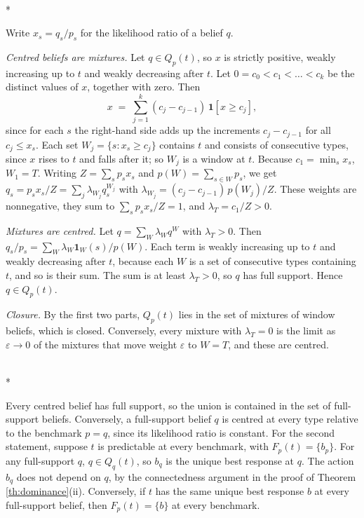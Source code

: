 \documentclass[12pt]{article}
\makeatletter
\theoremstyle{definition}
\renewenvironment{proof}[1][\proofname]{\par
  \pushQED{\qed}%
  \normalfont \topsep6\p@\@plus6\p@\relax
  \trivlist
  \item[\hskip\labelsep\itshape #1\@addpunct{.}]\mbox{}\\*
  \ignorespaces
}{%
  \popQED\endtrivlist\@endpefalse
}
\makeatother
\begin{document}
\begin{proof}[Proof of Lemma \ref{lem:windows}]
Write $x_s = q_s/p_s$ for the likelihood ratio of a belief $q$.

\emph{Centred beliefs are mixtures.} Let $q \in Q_p(t)$, so $x$ is strictly positive, weakly increasing up to $t$ and weakly decreasing after $t$. Let $0 = c_0 < c_1 < \dots < c_k$ be the distinct values of $x$, together with zero. Then
\[
x \;=\; \sum_{j=1}^{k} (c_j - c_{j-1})\, \mathbf{1}[x \ge c_j],
\]
since for each $s$ the right-hand side adds up the increments $c_j - c_{j-1}$ for all $c_j \le x_s$. Each set $W_j = \{s : x_s \ge c_j\}$ contains $t$ and consists of consecutive types, since $x$ rises to $t$ and falls after it; so $W_j$ is a window at $t$. Because $c_1 = \min_s x_s$, $W_1 = T$. Writing $Z = \sum_s p_s x_s$ and $p(W) = \sum_{s \in W} p_s$, we get $q_s = p_s x_s / Z = \sum_j \lambda_{W_j} q^{W_j}_s$ with $\lambda_{W_j} = (c_j - c_{j-1})\, p(W_j)/Z$. These weights are nonnegative, they sum to $\sum_s p_s x_s / Z = 1$, and $\lambda_T = c_1 / Z > 0$.

\emph{Mixtures are centred.} Let $q = \sum_W \lambda_W q^W$ with $\lambda_T > 0$. Then $q_s/p_s = \sum_W \lambda_W \mathbf{1}_W(s)/p(W)$. Each term is weakly increasing up to $t$ and weakly decreasing after $t$, because each $W$ is a set of consecutive types containing $t$, and so is their sum. The sum is at least $\lambda_T > 0$, so $q$ has full support. Hence $q \in Q_p(t)$.

\emph{Closure.} By the first two parts, $Q_p(t)$ lies in the set of mixtures of window beliefs, which is closed. Conversely, every mixture with $\lambda_T = 0$ is the limit as $\varepsilon \to 0$ of the mixtures that move weight $\varepsilon$ to $W = T$, and these are centred.
\end{proof}

\begin{proof}[Proof of Lemma \ref{lem:union}]
Every centred belief has full support, so the union is contained in the set of full-support beliefs. Conversely, a full-support belief $q$ is centred at every type relative to the benchmark $p = q$, since its likelihood ratio is constant. For the second statement, suppose $t$ is predictable at every benchmark, with $F_p(t) = \{b_p\}$. For any full-support $q$, $q \in Q_q(t)$, so $b_q$ is the unique best response at $q$. The action $b_q$ does not depend on $q$, by the connectedness argument in the proof of Theorem \ref{th:dominance}(ii). Conversely, if $t$ has the same unique best response $b$ at every full-support belief, then $F_p(t) = \{b\}$ at every benchmark.
\end{proof}
\end{document}
